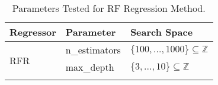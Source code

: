 \begin{table}[ht]
\centering
\caption{Parameters Tested for RF Regression Method.}
\label{tab:regressor_params}
\begin{tabular}{|p{1.5cm}|l|l|}
\hline
\textbf{Regressor}          & \textbf{Parameter}        & \textbf{Search Space}                           \\ \hline
\multirow{5}{*}{RFR} & n\_estimators & $\{100, ..., 1000\} \subseteq \mathbb{Z}$                                  \\ \cline{2-3}
                            & max\_depth                 &  $\{3,...,10\} \subseteq \mathbb{Z}$                                      \\ \cline{2-3}

\end{tabular}
\end{table}
